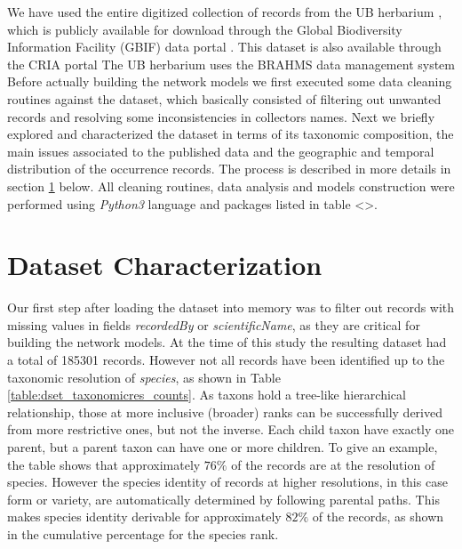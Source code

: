 We have used the entire digitized collection of records from the UB herbarium \cite{gbif_ubdataset}, which is publicly available for download through the Global Biodiversity Information Facility (GBIF) data portal \cite{gbif}.
This dataset is also available through the CRIA portal %
The UB herbarium uses the BRAHMS data management system %
%
Before actually building the network models we first executed some data cleaning routines against the dataset, which basically consisted of filtering out unwanted records and resolving some inconsistencies in collectors names.
%
Next we briefly explored and characterized the dataset in terms of its taxonomic composition, the main issues associated to the published data and the geographic and temporal distribution of the occurrence records.
%
The process is described in more details in section \ref{section:ub_characterization} below.
%
All cleaning routines, data analysis and models construction were performed using \textit{Python3} language and packages listed in table <>. %








\section{Dataset Characterization}\label{section:ub_characterization}


Our first step after loading the dataset into memory was to filter out records with missing values in fields \textit{recordedBy} or \textit{scientificName}, as they are critical for building the network models.
At the time of this study the resulting dataset had a total of 185301 records. However not all records have been identified up to the taxonomic resolution of \textit{species}, as shown in Table \ref{table:dset_taxonomicres_counts}. 
As taxons hold a tree-like hierarchical relationship, those at more inclusive (broader) ranks can be successfully derived from more restrictive ones, but not the inverse. Each child taxon have exactly one parent, but a parent taxon can have one or more children.
To give an example, the table shows that approximately $76\%$ of the records are at the resolution of species. However the species identity of records at higher resolutions, in this case form or variety, are automatically determined by following parental paths. This makes species identity derivable for approximately $82\%$ of the records, as shown in the cumulative percentage for the species rank.

